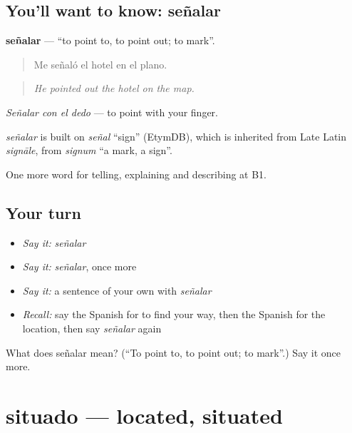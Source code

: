 \subsection*{You'll want to know: señalar}
\textbf{señalar} — \textquotedblleft{}to point to, to point out; to mark\textquotedblright{}.

\begin{quote}
Me señaló el hotel en el plano.
\end{quote}

\begin{quote}
\emph{He pointed out the hotel on the map.}
\end{quote}

\emph{Señalar con el dedo} — to point with your finger.

\begin{cousinweb}
\emph{señalar} is built on \emph{señal} \textquotedblleft{}sign\textquotedblright{} (EtymDB), which is inherited from Late Latin \emph{signāle}, from \emph{signum} \textquotedblleft{}a mark, a sign\textquotedblright{}.
\end{cousinweb}

\begin{grammarlens}[title={What you've built}]
One more word for telling, explaining and describing at B1.
\end{grammarlens}

\subsection*{Your turn}
\begin{itemize}
\raggedright
  \item \emph{Say it:} \emph{señalar}
  \item \emph{Say it:} \emph{señalar}, once more
  \item \emph{Say it:} a sentence of your own with \emph{señalar}
  \item \emph{Recall:} say the Spanish for to find your way, then the Spanish for the location, then say \emph{señalar} again
\end{itemize}

\begin{tcolorbox}[breakable,colback=teal!4,colframe=teal!35!black,title={Before you move on}]
What does señalar mean? (\textquotedblleft{}To point to, to point out; to mark\textquotedblright{}.) Say it once more.
\end{tcolorbox}
\section[situado]{situado — located, situated}

